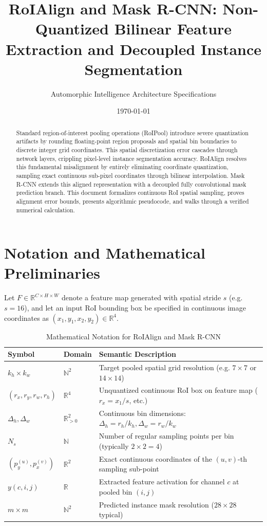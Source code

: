 \documentclass[11pt,a4paper]{article}
\title{RoIAlign and Mask R-CNN: Non-Quantized Bilinear Feature Extraction and Decoupled Instance Segmentation}
\author{Automorphic Intelligence Architecture Specifications}
\date{\today}
\theoremstyle{definition}
\begin{document}
\maketitle

\begin{abstract}
Standard region-of-interest pooling operations (RoIPool) introduce severe quantization artifacts by rounding floating-point region proposals and spatial bin boundaries to discrete integer grid coordinates. This spatial discretization error cascades through network layers, crippling pixel-level instance segmentation accuracy. RoIAlign resolves this fundamental misalignment by entirely eliminating coordinate quantization, sampling exact continuous sub-pixel coordinates through bilinear interpolation. Mask R-CNN extends this aligned representation with a decoupled fully convolutional mask prediction branch. This document formalizes continuous RoI spatial sampling, proves alignment error bounds, presents algorithmic pseudocode, and walks through a verified numerical calculation.
\end{abstract}

\section{Notation and Mathematical Preliminaries}

Let $F \in \mathbb{R}^{C \times H \times W}$ denote a feature map generated with spatial stride $s$ (e.g. $s = 16$), and let an input RoI bounding box be specified in continuous image coordinates as $(x_1, y_1, x_2, y_2) \in \mathbb{R}^4$.

\begin{table}[h]
\centering
\caption{Mathematical Notation for RoIAlign and Mask R-CNN}
\begin{tabular}{lll}
\toprule
\textbf{Symbol} & \textbf{Domain} & \textbf{Semantic Description} \\
\midrule
$k_h \times k_w$ & $\mathbb{N}^2$ & Target pooled spatial grid resolution (e.g. $7 \times 7$ or $14 \times 14$) \\
$(r_x, r_y, r_w, r_h)$ & $\mathbb{R}^4$ & Unquantized continuous RoI box on feature map ($r_x = x_1/s$, etc.) \\
$\Delta_h, \Delta_w$ & $\mathbb{R}_{> 0}^2$ & Continuous bin dimensions: $\Delta_h = r_h / k_h, \Delta_w = r_w / k_w$ \\
$N_s$ & $\mathbb{N}$ & Number of regular sampling points per bin (typically $2 \times 2 = 4$) \\
$(p_y^{(u)}, p_x^{(v)})$ & $\mathbb{R}^2$ & Exact continuous coordinates of the $(u, v)$-th sampling sub-point \\
$y(c, i, j)$ & $\mathbb{R}$ & Extracted feature activation for channel $c$ at pooled bin $(i, j)$ \\
$m \times m$ & $\mathbb{N}^2$ & Predicted instance mask resolution ($28 \times 28$ typical) \\
\bottomrule
\end{tabular}
\end{table}
\end{document}
